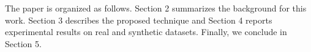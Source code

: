 \documentclass{article}
\begin{document}
  



The paper is organized as follows. Section 2 summarizes the background for this work. Section 3 describes the proposed technique and Section 4 reports experimental results on real and synthetic datasets. Finally, we conclude in Section 5.
 
\end{document}
